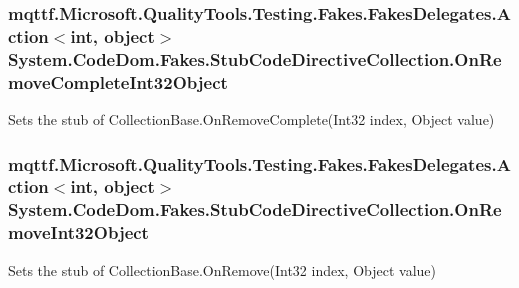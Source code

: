 \hypertarget{class_system_1_1_code_dom_1_1_fakes_1_1_stub_code_directive_collection_a15841f6e8f424f4da401628532111059}{
\subsubsection[{On\-Remove\-Complete\-Int32\-Object}]{\setlength{\rightskip}{0pt plus 5cm}mqttf.\-Microsoft.\-Quality\-Tools.\-Testing.\-Fakes.\-Fakes\-Delegates.\-Action$<$int, object$>$ System.\-Code\-Dom.\-Fakes.\-Stub\-Code\-Directive\-Collection.\-On\-Remove\-Complete\-Int32\-Object}}\label{class_system_1_1_code_dom_1_1_fakes_1_1_stub_code_directive_collection_a15841f6e8f424f4da401628532111059}


Sets the stub of Collection\-Base.\-On\-Remove\-Complete(\-Int32 index, Object value)

\hypertarget{class_system_1_1_code_dom_1_1_fakes_1_1_stub_code_directive_collection_a3f68d58ece2d8c1e164197a478dcbd48}{
\subsubsection[{On\-Remove\-Int32\-Object}]{\setlength{\rightskip}{0pt plus 5cm}mqttf.\-Microsoft.\-Quality\-Tools.\-Testing.\-Fakes.\-Fakes\-Delegates.\-Action$<$int, object$>$ System.\-Code\-Dom.\-Fakes.\-Stub\-Code\-Directive\-Collection.\-On\-Remove\-Int32\-Object}}\label{class_system_1_1_code_dom_1_1_fakes_1_1_stub_code_directive_collection_a3f68d58ece2d8c1e164197a478dcbd48}


Sets the stub of Collection\-Base.\-On\-Remove(\-Int32 index, Object value)

